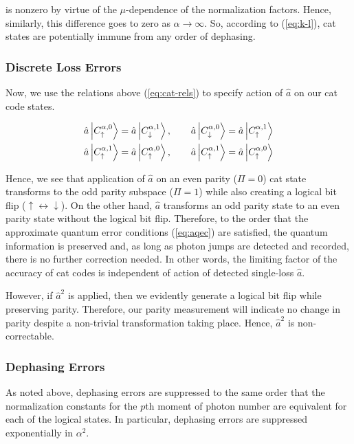 \documentclass[12]{amsart}
\newcommand\0{\mathbf{0}}
\newcommand\<{\langle}
\renewcommand\>{\rangle}
\begin{document}
is nonzero by virtue of the $\mu$-dependence of the normalization factors. Hence, similarly, this difference goes to zero as $\alpha \rightarrow \infty$. So, according to (\ref{eq:k-l}), cat states are potentially immune from any order of dephasing.

\subsubsection{Discrete Loss Errors}

Now, we use the relations above (\ref{eq:cat-rels}) to specify action of $\hat{a}$ on our cat code states.

\begin{align*}
\hat{a}	\ket{C^{\alpha, 0}_{\uparrow}} &= \hat{a}	\ket{C^{\alpha, 1}_{\downarrow}}, \qquad
\hat{a}	\ket{C^{\alpha, 0}_{\downarrow}} = \hat{a}	\ket{C^{\alpha, 1}_{\uparrow}}\\
\hat{a}	\ket{C^{\alpha, 1}_{\uparrow}} &= \hat{a}	\ket{C^{\alpha, 0}_{\uparrow}},\qquad 
\hat{a}	\ket{C^{\alpha, 1}_{\uparrow}} = \hat{a}	\ket{C^{\alpha, 0}_{\uparrow}}
\end{align*}

Hence, we see that application of $\hat{a}$ on an even parity ($\Pi = 0$) cat state transforms to the odd parity subspace ($\Pi = 1$) while also creating a logical bit flip ($\uparrow \leftrightarrow \downarrow$). On the other hand, $\hat{a}$ transforms an odd parity state to an even parity state without the logical bit flip. Therefore, to the order that the approximate quantum error conditions (\ref{eq:aqec}) are satisfied, the quantum information is preserved and, as long as photon jumps are detected and recorded, there is no further correction needed. In other words, the limiting factor of the accuracy of cat codes is independent of action of detected single-loss $\hat{a}$.

However, if $\hat{a}^2$ is applied, then we evidently generate a logical bit flip while preserving parity. Therefore, our parity measurement will indicate no change in parity despite a non-trivial transformation taking place. Hence, $\hat{a}^2$ is non-correctable.

\subsubsection{Dephasing Errors}

As noted above, dephasing errors are suppressed to the same order that the normalization constants for the $p$th moment of photon number are equivalent for each of the logical states. In particular, dephasing errors are suppressed exponentially in $\alpha^2$.
\end{document}
